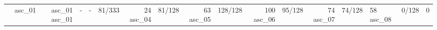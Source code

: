 \begin{tabular}{lrrrrrrrrrrrr}
\toprule
 & asc_01 & asc_01 %
\midrule
asc_01 & - & - & 81/333 & 24%
asc_04 & 81/128 & 63%
asc_05 & 128/128 & 100%
asc_06 & 95/128 & 74%
asc_07 & 74/128 & 58%
asc_08 & 0/128 & 0%
\bottomrule
\end{tabular}
